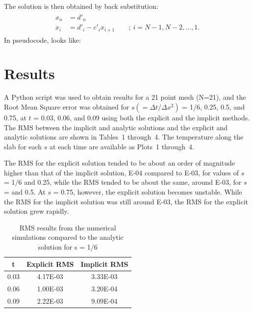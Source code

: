 \documentclass[twocolumn,10pt]{asme2ej}
\begin{document}
The solution is then obtained by back substitution:
\begin{multline}
\begin{split}
x_n & = d'_n\, \\
x_i & = d'_i - c'_i x_{i + 1} \qquad ; \ i = N - 1, N - 2, \ldots, 1.
\end{split}
\end{multline}
In pseudocode, looks like:\\
\begin{algorithmic}
\EndWhile
\end{algorithmic}

\section{Results}

A Python script was used to obtain results for a 21 point mesh (N=21), and the Root Mean Square error was obtained for $s(=\Delta t/ \Delta x^2)$ = 1/6, 0.25, 0.5, and 0.75, at $t$ = 0.03, 0.06, and 0.09 using both the explicit and the implicit methods. The RMS between the implicit and analytic solutions and the explicit and analytic solutions are shown in Tables~1 through~4. The temperature along the slab for each $s$ at each time are available as Plots~1 through~4.

The RMS for the explicit solution tended to be about an order of magnitude higher than that of the implicit solution, E-04 compared to E-03, for values of $s$ = 1/6 and 0.25, while the RMS tended to be about the same, around E-03, for $s$ = and 0.5. At $s$ = 0.75, however, the explicit solution becomes unstable. While the RMS for the implicit solution was still around E-03, the RMS for the explicit solution grew rapidly.

\begin{table}[h]
\begin{center}
\label{table_results1}
\begin{tabular}{|c | c c|}
\hline
t & Explicit RMS & Implicit RMS \\
\hline
0.03 & 4.17E-03 & 3.33E-03\\
0.06 & 1.00E-03 & 3.20E-04\\
0.09 & 2.22E-03 & 9.09E-04\\
\hline
\end{tabular}
\caption{RMS results from the numerical simulations compared to the analytic solution for s = 1/6}
\end{center}
\end{table}
\end{document}
